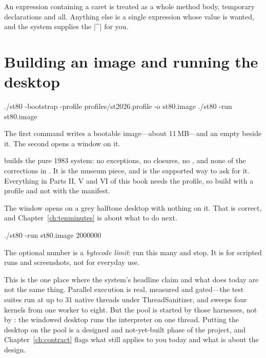 An expression containing a caret is treated as a whole method body, temporary
declarations and all. Anything else is a single expression whose value is
wanted, and the system supplies the \ct|^| for you.

\section{Building an image and running the desktop}

\begin{sh}
./st80 -bootstrap -profile profiles/st2026.profile -o st80.image
./st80 -run st80.image
\end{sh}

The first command writes a bootable image---about 11\,MB---and an empty
 beside it. The second opens a window on it.

\begin{stwarn}
 builds the pure 1983 system: no exceptions,
no closures, no , and none of the corrections in . It is
the museum piece, and  is the supported way to
ask for it. Everything in Parts II, V and VI of this book needs the
 profile, so build with a profile and not with the manifest.
\end{stwarn}

The window opens on a grey halftone desktop with nothing on it. That is
correct, and Chapter~\ref{ch:tenminutes} is about what to do next.

\begin{sh}
./st80 -run st80.image 2000000
\end{sh}

The optional number is a \emph{bytecode limit}: run this many and stop. It is
for scripted runs and screenshots, not for everyday use.

\begin{stwarn}
This is the one place where the system's headline claim and what
 does today are not the same thing. Parallel execution is real,
measured and gated---the test suites run at up to 31 native threads under
ThreadSanitizer, and  sweeps four kernels from one worker to
eight. But the pool is started by those harnesses, not by : the
windowed desktop runs the interpreter on one thread. Putting the desktop on
the pool is a designed and not-yet-built phase of the project, and
Chapter~\ref{ch:contract} flags what still applies to you today and what is
about the design.
\end{stwarn}

